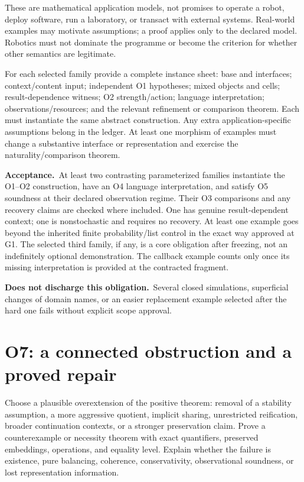 \documentclass[11pt,a4paper]{article}
\newcommand{\accept}{\par\textbf{Acceptance.}\ }
\newcommand{\notaccepted}{\par\textbf{Does not discharge this obligation.}\ }
\begin{document}
These are mathematical application models, not promises to operate a robot,
deploy software, run a laboratory, or transact with external systems.
Real-world examples may motivate assumptions; a proof applies only to the
declared model. Robotics must not dominate the programme or become the
criterion for whether other semantics are legitimate.

For each selected family provide a complete instance sheet: base and
interfaces; context/content input; independent O1 hypotheses; mixed objects
and cells; result-dependence witness; O2 strength/action; language
interpretation; observations/resources; and the relevant refinement or
comparison theorem. Each must instantiate the same abstract construction.
Any extra application-specific assumptions belong in the ledger. At least
one morphism of examples must change a substantive interface or representation
and exercise the naturality/comparison theorem.

\accept At least two contrasting parameterized families instantiate the O1--O2
construction, have an O4 language interpretation, and satisfy O5 soundness at
their declared observation regime. Their O3 comparisons and any recovery
claims are checked where included. One has genuine result-dependent context; one is
nonstochastic and requires no recovery. At least one example goes beyond
the inherited finite probability/list control in the exact way approved at
G1. The selected third family, if any, is a core obligation after freezing,
not an indefinitely optional demonstration. The callback example counts only
once its missing interpretation is provided at the contracted fragment.

\notaccepted Several closed simulations, superficial changes of domain
names, or an easier replacement example selected after the hard one fails
without explicit scope approval.

\section{O7: a connected obstruction and a proved repair}\label{sec:o7}

Choose a plausible overextension of the positive theorem: removal of a
stability assumption, a more aggressive quotient, implicit sharing,
unrestricted reification, broader continuation contexts, or a stronger
preservation claim. Prove a counterexample or necessity theorem with exact
quantifiers, preserved embeddings, operations, and equality level. Explain
whether the failure is existence, pure balancing, coherence, conservativity,
observational soundness, or lost representation information.
\end{document}
